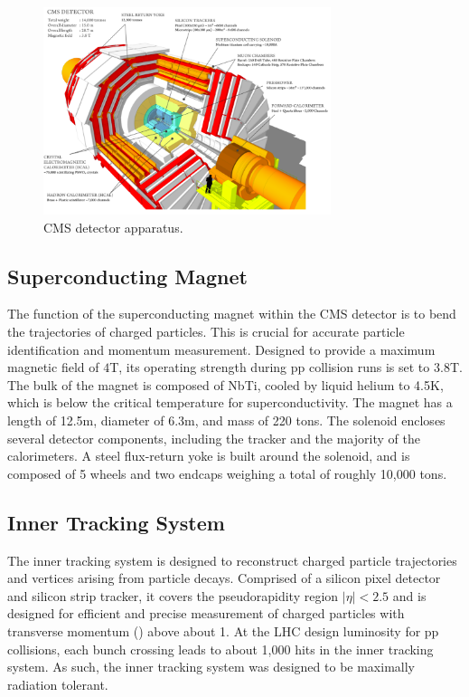 \begin{figure}[tb]
  \centering
   \includegraphics[width=0.75\textwidth]{fig/experiment/detector/cms_about_detector.png}
	\caption[CMS detector apparatus.]{CMS detector apparatus.~\cite{detector_image}}
	\label{fig:detector}
\end{figure}


\subsection{Superconducting Magnet}
The function of the superconducting magnet within the CMS detector is to bend the trajectories of charged particles. This is crucial for accurate particle identification and momentum measurement. 
Designed to provide a maximum magnetic field of $4$\unit{T}, its operating strength during pp collision runs is set to $3.8$\unit{T}. The bulk of the magnet is composed of NbTi, cooled by 
liquid helium to 4.5K, which is below the critical temperature for superconductivity. The magnet has a length of 12.5m, diameter of 6.3m, and mass of 220 tons. The solenoid encloses 
several detector components, including the tracker and the majority of the calorimeters. A steel flux-return yoke is built around the solenoid, and is composed of 5 wheels and two endcaps weighing 
a total of roughly 10,000 tons. 

\subsection{Inner Tracking System}
The inner tracking system is designed to reconstruct charged particle trajectories and vertices arising from particle decays. Comprised of a silicon pixel detector and silicon strip tracker, 
it covers the pseudorapidity region $|\eta| < 2.5$ and is designed for efficient and precise measurement of charged particles with transverse momentum (\pt) above about 1\GeV. 
At the LHC design luminosity for pp collisions, each bunch crossing leads to about 1,000 hits in the inner tracking system. As such, the inner tracking system was designed to be 
maximally radiation tolerant. 


